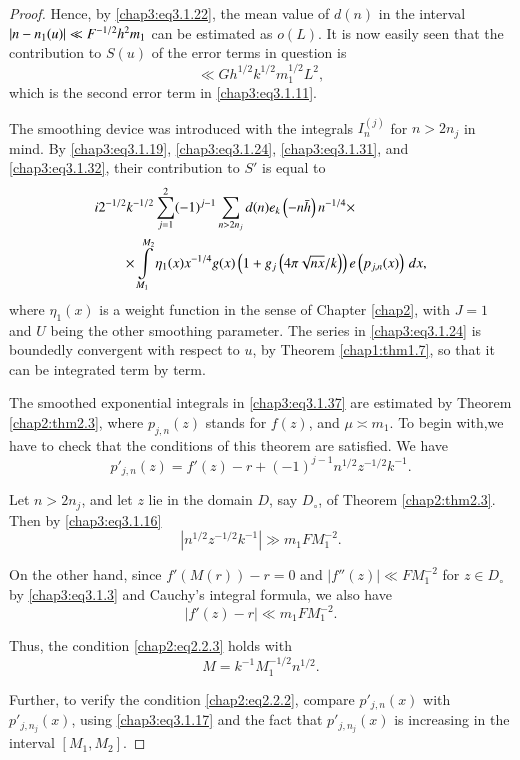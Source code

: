\begin{proof}
Hence, by \eqref{chap3:eq3.1.22}, the mean value of $d(n)$ in the
interval $|n-n_1(u)|\break\ll F^{-1/2}h^2m_1$ can be estimated as $o(L)$. It
is now easily seen that the contribution to $S(u)$ of the error terms
in question is 
$$
\ll Gh^{1/2}k^{1/2}m_1^{1/2}L^2,
$$
which is the second error term in \eqref{chap3:eq3.1.11}.

The smoothing device was introduced with the integrals $I_n^{(j)}$ for
$n>2n_j$ in mind. By \eqref{chap3:eq3.1.19}, \eqref{chap3:eq3.1.24},
\eqref{chap3:eq3.1.31}, and \eqref{chap3:eq3.1.32}, their contribution
to $S'$ is equal to 
\begin{align}
& i2^{-1/2}k^{-1/2}\sum\limits_{j=1}^2(-1)^{j-1}\sum\limits_{n>2n_j}
d(n)e_k\left(-n\bar{h}\right)n^{-1/4}\times\label{chap3:eq3.1.37}\\
&\qquad \times \int\limits_{M_1}^{M_2}\eta_1(x)x^{-1/4}g(x)\left(1+g_j\left
(4\pi\sqrt{nx}/k\right)\right)e\left(p_{j,n}(x)\right)\,dx,\notag 
\end{align}
where $\eta_1(x)$ is a weight function in the sense of Chapter
\ref{chap2}, with $J=1$ and $U$ being the other smoothing
parameter. The series in \eqref{chap3:eq3.1.24} is boundedly
convergent with respect to $u$, by Theorem \ref{chap1:thm1.7}, so that
it can be integrated term by term. 

The smoothed exponential integrals in \eqref{chap3:eq3.1.37} are
estimated by Theorem \ref{chap2:thm2.3}, where $p_{j,n}(z)$ stands for
$f(z)$, and $\mu\asymp m_1$. To begin with,\pageoriginale we have to
check that the conditions of this theorem are satisfied. We have 
$$
p'_{j,n}(z)=f'(z)-r+(-1)^{j-1}n^{1/2}z^{-1/2}k^{-1}.
$$

Let $n>2n_j$, and let $z$ lie in the domain $D$, say $D_\circ$, of
Theorem \ref{chap2:thm2.3}. Then by \eqref{chap3:eq3.1.16}
$$
\left|n^{1/2}z^{-1/2}k^{-1}\right|\gg m_1FM_1^{-2}.
$$

On the other hand, since $f'(M(r))-r=0$ and $|f''(z)|\ll FM_1^{-2}$
for $z\in D_\circ$ by \eqref{chap3:eq3.1.3} and Cauchy's integral
formula, we also have 
$$
|f'(z)-r|\ll m_1FM_1^{-2}.
$$

Thus, the condition \eqref{chap2:eq2.2.3} holds with 
\begin{equation}\label{chap3:eq3.1.38}
M=k^{-1}M_1^{-1/2}n^{1/2}.
\end{equation}

Further, to verify the condition \eqref{chap2:eq2.2.2}, compare
$p'_{j,n}(x)$ with $p'_{j,n_j}(x)$, using \eqref{chap3:eq3.1.17} and
the fact that $p'_{j,n_j}(x)$ is increasing in the interval\break
$[M_1,M_2]$. 


\end{proof}
